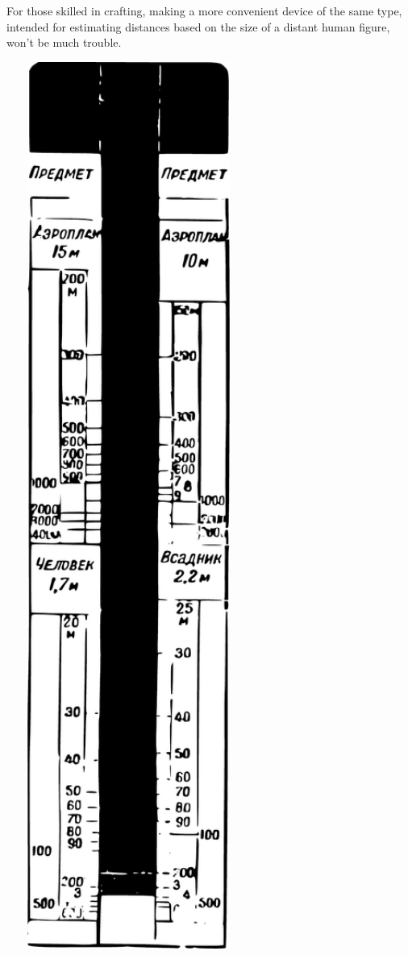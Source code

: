 For those skilled in crafting, making a more convenient device of the same type, intended for estimating distances based on the size of a distant human figure, won't be much trouble.

\begin{marginfigure}[-2cm]%
\centering
\includegraphics[width=0.6\textwidth]{figures/ch-02/fig-040.pdf}
\end{marginfigure}

